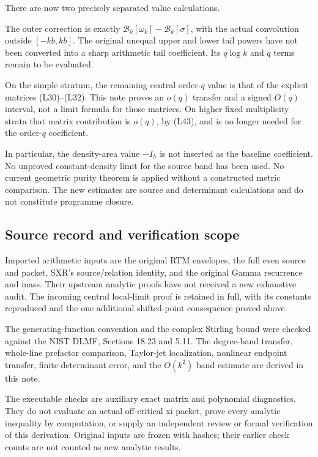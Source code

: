 There are now two precisely separated value calculations.

The outer correction is exactly \(\mathcal B_k[\omega_k]-\mathcal B_k[\sigma]\), with the actual convolution outside \([-kb,kb]\). The original unequal upper and lower tail powers have not been converted into a sharp arithmetic tail coefficient. Its \(q\log k\) and \(q\) terms remain to be evaluated.

On the simple stratum, the remaining central order-\(q\) value is that of the explicit matrices (L30)--(L32). This note proves an \(o(q)\) transfer and a signed \(O(q)\) interval, not a limit formula for those matrices. On higher fixed multiplicity strata that matrix contribution is \(o(q)\), by (L43), and is no longer needed for the order-\(q\) coefficient.

In particular, the density-area value \(-I_h\) is not inserted as the baseline coefficient. No unproved constant-density limit for the source band has been used. No current geometric purity theorem is applied without a constructed metric comparison. The new estimates are source and determinant calculations and do not constitute programme closure.

\subsection{Source record and verification scope}\label{loc:source-record-and-verification-scope}

Imported arithmetic inputs are the original RTM envelopes, the full even source and packet, SXR's source/relation identity, and the original Gamma recurrence and mass. Their upstream analytic proofs have not received a new exhaustive audit. The incoming central local-limit proof is retained in full, with its constants reproduced and the one additional shifted-point consequence proved above.

The generating-function convention and the complex Stirling bound were checked against the NIST DLMF, Sections 18.23 and 5.11. The degree-band transfer, whole-line prefactor comparison, Taylor-jet localization, nonlinear endpoint transfer, finite determinant error, and the \(O(k^2)\) band estimate are derived in this note.

The executable checks are auxiliary exact matrix and polynomial diagnostics. They do not evaluate an actual off-critical xi packet, prove every analytic inequality by computation, or supply an independent review or formal verification of this derivation. Original inputs are frozen with hashes; their earlier check counts are not counted as new analytic results.

